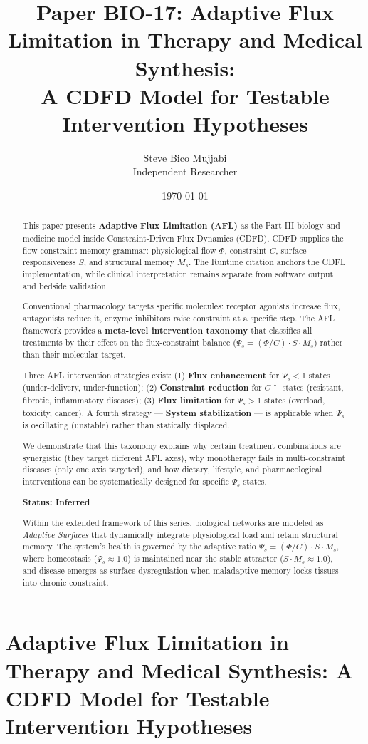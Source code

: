 \documentclass[12pt,a4paper]{article}
\title{\textbf{Paper BIO-17: Adaptive Flux Limitation in Therapy and Medical Synthesis:\\ A CDFD Model for Testable Intervention Hypotheses}}
\author{Steve Bico Mujjabi\\ \small Independent Researcher}
\date{\today}
\begin{document}
\maketitle

\clearpage
\section*{Adaptive Flux Limitation in Therapy and Medical Synthesis: A CDFD Model for Testable Intervention Hypotheses}

\begin{abstract}

This paper presents \textbf{Adaptive Flux Limitation (AFL)} as the Part III biology-and-medicine model inside Constraint-Driven Flux Dynamics (CDFD). CDFD supplies the flow-constraint-memory grammar: physiological flow $\Phi$, constraint $C$, surface responsiveness $S$, and structural memory $M_s$. The Runtime citation anchors the CDFL implementation, while clinical interpretation remains separate from software output and bedside validation.

Conventional pharmacology targets specific molecules: receptor agonists increase flux, antagonists reduce it, enzyme inhibitors raise constraint at a specific step. The AFL framework provides a \textbf{meta-level intervention taxonomy} that classifies all treatments by their effect on the flux-constraint balance ($\Psi_s = (\Phi/C) \cdot S \cdot M_s$) rather than their molecular target.

Three AFL intervention strategies exist: (1) \textbf{Flux enhancement} for $\Psi_s < 1$ states (under-delivery, under-function); (2) \textbf{Constraint reduction} for $C \uparrow$ states (resistant, fibrotic, inflammatory diseases); (3) \textbf{Flux limitation} for $\Psi_s > 1$ states (overload, toxicity, cancer). A fourth strategy --- \textbf{System stabilization} --- is applicable when $\Psi_s$ is oscillating (unstable) rather than statically displaced.

We demonstrate that this taxonomy explains why certain treatment combinations are synergistic (they target different AFL axes), why monotherapy fails in multi-constraint diseases (only one axis targeted), and how dietary, lifestyle, and pharmacological interventions can be systematically designed for specific $\Psi_s$ states.

\textbf{Status: Inferred}

\medskip
\noindent Within the extended framework of this series, biological networks are modeled as \emph{Adaptive Surfaces} that dynamically integrate physiological load and retain structural memory. The system's health is governed by the adaptive ratio $\Psi_s = (\Phi/C) \cdot S \cdot M_s$, where homeostasis ($\Psi_s \approx 1.0$) is maintained near the stable attractor ($S \cdot M_s \approx 1.0$), and disease emerges as surface dysregulation when maladaptive memory locks tissues into chronic constraint.

\end{abstract}
\end{document}
